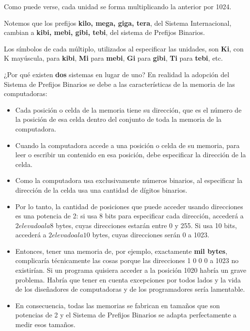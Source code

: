 \documentclass[spanish,A4,]{article}
\begin{document}
Como puede verse, cada unidad se forma multiplicando la anterior por
1024.

Notemos que los prefijos \textbf{kilo, mega, giga, tera}, del Sistema
Internacional, cambian a \textbf{kibi, mebi, gibi, tebi}, del sistema de
Prefijos Binarios.

Los símbolos de cada múltiplo, utilizados al especificar las unidades,
son \textbf{Ki}, con K mayúscula, para \textbf{kibi}, \textbf{Mi} para
\textbf{mebi}, \textbf{Gi} para \textbf{gibi}, \textbf{Ti} para
\textbf{tebi}, etc.

¿Por qué existen \textbf{dos} sistemas en lugar de uno? En realidad la
adopción del Sistema de Prefijos Binarios se debe a las características
de la memoria de las computadoras:

\begin{itemize}
\itemsep1pt\parskip0pt
\item
  Cada posición o celda de la memoria tiene su dirección, que es el
  número de la posición de esa celda dentro del conjunto de toda la
  memoria de la computadora.
\item
  Cuando la computadora accede a una posición o celda de su memoria,
  para leer o escribir un contenido en esa posición, debe especificar la
  dirección de la celda.
\item
  Como la computadora usa exclusivamente números binarios, al
  especificar la dirección de la celda usa una cantidad de dígitos
  binarios.
\item
  Por lo tanto, la cantidad de posiciones que puede acceder usando
  direcciones es una potencia de 2: si usa 8 bits para especificar cada
  dirección, accederá a $2 elevado a la 8$ bytes, cuyas direcciones estarán entre 0 y
  255. Si usa 10 bits, accederá a $2 elevado a la {10}$ bytes, cuyas direcciones
  serán 0 a 1023.
\item
  Entonces, tener una memoria de, por ejemplo, exactamente \textbf{mil
  bytes}, complicaría técnicamente las cosas porque las direcciones 1 0 0 0
  a 1023 no existirían. Si un programa quisiera acceder a la posición
  1020 habría un grave problema. Habría que tener en cuenta excepciones
  por todos lados y la vida de los diseñadores de computadoras y de los
  programadores sería lamentable.
\item
  En consecuencia, todas las memorias se fabrican en tamaños que son
  potencias de 2 y el Sistema de Prefijos Binarios se adapta
  perfectamente a medir esos tamaños.
\end{itemize}
\end{document}
